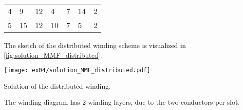 \begin{solutionblock}
\begin{solutiontable}[ht]
\begin{tabular}{c|C{1cm}|C{1cm}|C{1cm}|C{1cm}|C{1cm}|C{1cm}}
            4                         & 9                           & 12                          & 4                           & 7   & 14 & 2   \\
            5                         & 15                          & 12                          & 10                          & 7   & 5  & 2   \\
            \bottomrule
        \end{tabular}
        \label{tab:solution_distributedWinding}
    \end{solutiontable}

    The sketch of the distributed winding scheme is visualized in \autoref{fig:solution_MMF_distributed}.
    \begin{solutionfigure}[ht]
        \centering
        \texttt{[image: ex04/solution\_MMF\_distributed.pdf]}
        \caption{Solution of the distributed winding.}
        \label{fig:solution_MMF_distributed}
    \end{solutionfigure}

\end{solutionblock}



\begin{solutionblock}
    The winding diagram has 2 winding layers, due to the two conductors per slot.
\end{solutionblock}



